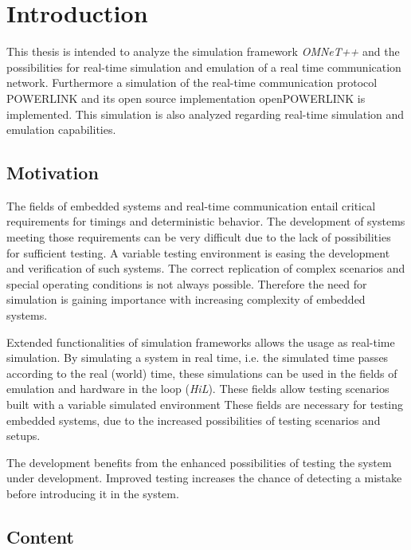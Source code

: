 \chapter{Introduction}
\label{cha:introduction}
This thesis is intended to analyze the simulation framework \emph{OMNeT++} \cite{omnet_manual} and the possibilities for real-time simulation and emulation of a real time communication network.
Furthermore a simulation of the real-time communication protocol POWERLINK and its open source implementation \mbox{openPOWERLINK} \cite{openpowerlink} is implemented. %
This simulation is also analyzed regarding real-time simulation and emulation capabilities.

\section{Motivation}
The fields of embedded systems and real-time communication entail critical requirements for timings and deterministic behavior.
The development of systems meeting those requirements can be very difficult due to the lack of possibilities for sufficient testing.
A variable testing environment is easing the development and verification of such systems.
The correct replication of complex scenarios and special operating conditions is not always possible.
Therefore the need for simulation is gaining importance with increasing complexity of embedded systems.

Extended functionalities of simulation frameworks allows the usage as real-time simulation.
By simulating a system in real time, i.e. the simulated time passes according to the real (world) time, these simulations can be used in the fields of emulation and hardware in the loop (\emph{HiL}).
These fields allow testing scenarios built with a variable simulated environment
These fields are necessary for testing embedded systems, due to the increased possibilities of testing scenarios and setups.

The development benefits from the enhanced possibilities of testing the system under development.
Improved testing increases the chance of detecting a mistake before introducing it in the system.



\section{Content}

